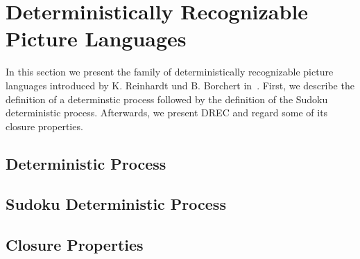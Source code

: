 \section{Deterministically Recognizable Picture Languages}
In this section we present the family of deterministically recognizable picture languages introduced
by K. Reinhardt und B. Borchert in~\cite{borchert2006deterministically}. First, we describe the
definition of a determinstic process followed by the definition of the Sudoku deterministic
process.
Afterwards, we present DREC and regard some of its closure properties. 
\subsection{Deterministic Process}



\subsection{Sudoku Deterministic Process}



\subsection{Closure Properties}

